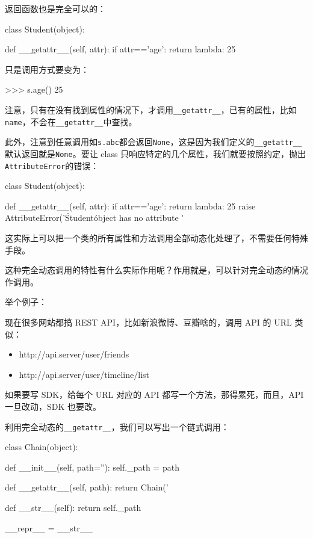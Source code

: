 返回函数也是完全可以的：

\begin{pythoncode}
class Student(object):

    def __getattr__(self, attr):
        if attr=='age':
            return lambda: 25
\end{pythoncode}

只是调用方式要变为：

\begin{pythoncode}
>>> s.age()
25
\end{pythoncode}

注意，只有在没有找到属性的情况下，才调用\texttt{\_\_getattr\_\_}，已有的属性，比如\texttt{name}，不会在\texttt{\_\_getattr\_\_}中查找。

此外，注意到任意调用如\texttt{s.abc}都会返回\texttt{None}，这是因为我们定义的\texttt{\_\_getattr\_\_}默认返回就是\texttt{None}。要让
class
只响应特定的几个属性，我们就要按照约定，抛出\texttt{AttributeError}的错误：

\begin{pythoncode}
class Student(object):

    def __getattr__(self, attr):
        if attr=='age':
            return lambda: 25
        raise AttributeError('\'Student\' object has no attribute \'%
\end{pythoncode}

这实际上可以把一个类的所有属性和方法调用全部动态化处理了，不需要任何特殊手段。

这种完全动态调用的特性有什么实际作用呢？作用就是，可以针对完全动态的情况作调用。

举个例子：

现在很多网站都搞 REST API，比如新浪微博、豆瓣啥的，调用 API 的 URL
类似：

\begin{itemize}
\item
  http://api.server/user/friends
\item
  http://api.server/user/timeline/list
\end{itemize}

如果要写 SDK，给每个 URL 对应的 API 都写一个方法，那得累死，而且，API
一旦改动，SDK 也要改。

利用完全动态的\texttt{\_\_getattr\_\_}，我们可以写出一个链式调用：

\begin{pythoncode}
class Chain(object):

    def __init__(self, path=''):
        self._path = path

    def __getattr__(self, path):
        return Chain('%

    def __str__(self):
        return self._path

    __repr__ = __str__
\end{pythoncode}

